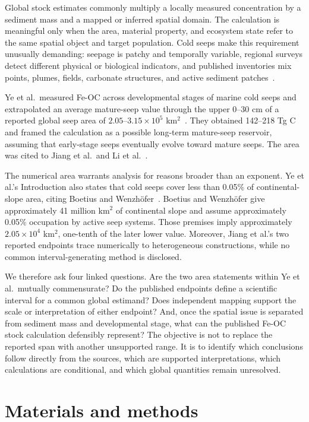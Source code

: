 \documentclass[11pt,letterpaper]{article}
\begin{document}
Global stock estimates commonly multiply a locally measured concentration by a sediment mass and a mapped or inferred spatial domain. The calculation is meaningful only when the area, material property, and ecosystem state refer to the same spatial object and target population. Cold seeps make this requirement unusually demanding: seepage is patchy and temporally variable, regional surveys detect different physical or biological indicators, and published inventories mix points, plumes, fields, carbonate structures, and active sediment patches~\cite{boetius2013,phrampus2020}.

Ye et al.\ measured Fe-OC across developmental stages of marine cold seeps and extrapolated an average mature-seep value through the upper 0--30 cm of a reported global seep area of $2.05$--$3.15\times10^5$ km$^2$~\cite{ye2026}. They obtained 142--218 Tg C and framed the calculation as a possible long-term mature-seep reservoir, assuming that early-stage seeps eventually evolve toward mature seeps. The area was cited to Jiang et al.\ and Li et al.~\cite{jiang2025,li2024}.

The numerical area warrants analysis for reasons broader than an exponent. Ye et al.'s Introduction also states that cold seeps cover less than 0.05\% of continental-slope area, citing Boetius and Wenzh\"ofer~\cite{ye2026,boetius2013}. Boetius and Wenzh\"ofer give approximately 41 million km$^2$ of continental slope and assume approximately 0.05\% occupation by active seep systems. Those premises imply approximately $2.05\times10^4$ km$^2$, one-tenth of the later lower value. Moreover, Jiang et al.'s two reported endpoints trace numerically to heterogeneous constructions, while no common interval-generating method is disclosed.

We therefore ask four linked questions. Are the two area statements within Ye et al.\ mutually commensurate? Do the published endpoints define a scientific interval for a common global estimand? Does independent mapping support the scale or interpretation of either endpoint? And, once the spatial issue is separated from sediment mass and developmental stage, what can the published Fe-OC stock calculation defensibly represent? The objective is not to replace the reported span with another unsupported range. It is to identify which conclusions follow directly from the sources, which are supported interpretations, which calculations are conditional, and which global quantities remain unresolved.

\section{Materials and methods}
\end{document}

